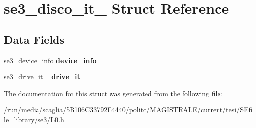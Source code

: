 \hypertarget{structse3__disco__it__}{\section{se3\-\_\-disco\-\_\-it\-\_\- Struct Reference}
\label{structse3__disco__it__}
}
\subsection*{Data Fields}
\begin{DoxyCompactItemize}
\item 
\hypertarget{structse3__disco__it___acab44529361f40d6b06a6075b501c88c}{\hyperlink{structse3__device__info__}{se3\-\_\-device\-\_\-info} {\bfseries device\-\_\-info}}\label{structse3__disco__it___acab44529361f40d6b06a6075b501c88c}

\item 
\hypertarget{structse3__disco__it___ae6e1e2bf6d543d5795d293e440716492}{\hyperlink{structse3__drive__it__}{se3\-\_\-drive\-\_\-it} {\bfseries \-\_\-drive\-\_\-it}}\label{structse3__disco__it___ae6e1e2bf6d543d5795d293e440716492}

\end{DoxyCompactItemize}


The documentation for this struct was generated from the following file\-:\begin{DoxyCompactItemize}
\item 
/run/media/scaglia/5\-B106\-C33792\-E4440/polito/\-M\-A\-G\-I\-S\-T\-R\-A\-L\-E/current/tesi/\-S\-Efile\-\_\-library/se3/L0.\-h\end{DoxyCompactItemize}
